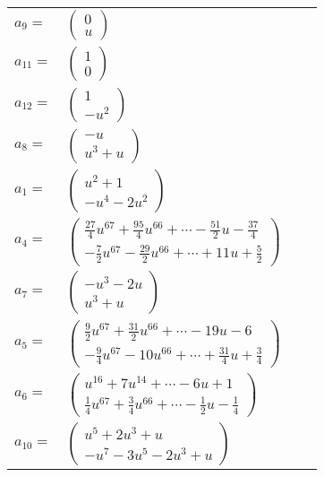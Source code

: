 \documentclass[1p]{elsarticle_modified}
\theoremstyle{definition}
\begin{document}
\begin{tabular}{m{7pt} m{180pt} m{7pt} m{180pt} }
\flushright $a_{9}=$&$\begin{pmatrix}0\\u\end{pmatrix}$ \\
\flushright $a_{11}=$&$\begin{pmatrix}1\\0\end{pmatrix}$ \\
\flushright $a_{12}=$&$\begin{pmatrix}1\\- u^2\end{pmatrix}$ \\
\flushright $a_{8}=$&$\begin{pmatrix}- u\\u^3+u\end{pmatrix}$ \\
\flushright $a_{1}=$&$\begin{pmatrix}u^2+1\\- u^4-2 u^2\end{pmatrix}$ \\
\flushright $a_{4}=$&$\begin{pmatrix}\frac{27}{4} u^{67}+\frac{95}{4} u^{66}+\cdots-\frac{51}{2} u-\frac{37}{4}\\-\frac{7}{2} u^{67}-\frac{29}{2} u^{66}+\cdots+11 u+\frac{5}{2}\end{pmatrix}$ \\
\flushright $a_{7}=$&$\begin{pmatrix}- u^3-2 u\\u^3+u\end{pmatrix}$ \\
\flushright $a_{5}=$&$\begin{pmatrix}\frac{9}{2} u^{67}+\frac{31}{2} u^{66}+\cdots-19 u-6\\-\frac{9}{4} u^{67}-10 u^{66}+\cdots+\frac{31}{4} u+\frac{3}{4}\end{pmatrix}$ \\
\flushright $a_{6}=$&$\begin{pmatrix}u^{16}+7 u^{14}+\cdots-6 u+1\\\frac{1}{4} u^{67}+\frac{3}{4} u^{66}+\cdots-\frac{1}{2} u-\frac{1}{4}\end{pmatrix}$ \\
\flushright $a_{10}=$&$\begin{pmatrix}u^5+2 u^3+u\\- u^7-3 u^5-2 u^3+u\end{pmatrix}$ \\

\end{tabular}
\end{document}
